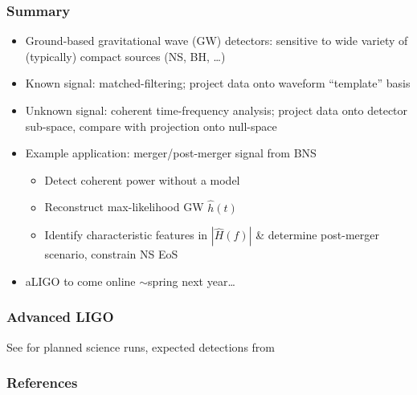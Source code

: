 \documentclass{beamer}
\def\gw#1{gravitational wave#1 (GW#1)\gdef\gw{GW}}
\newcommand{\red}[1]{{\color{red}{#1}}}
\begin{document}
\begin{frame}
    \frametitle{Summary}
    \small{
    \begin{itemize}
        \item Ground-based \gw{} detectors: sensitive to wide variety of
            (typically) compact sources (NS, BH, \dots)
        \item Known signal: matched-filtering; project data onto waveform
            ``template'' basis
        \item Unknown signal: coherent time-frequency analysis; project data
            onto detector sub-space, compare with projection onto null-space
        \item Example application: merger/post-merger signal from BNS
            \begin{itemize}
                \item Detect coherent power without a model
                \item Reconstruct max-likelihood \gw{} $\hat{h}(t)$
                \item Identify characteristic features in $|\hat{H}(f)|$ \&
                    determine post-merger scenario, constrain NS EoS
            \end{itemize}
        \item aLIGO to come online $\sim$spring next year\dots
    \end{itemize}
}

\end{frame}

\begin{frame}
    \frametitle{Advanced LIGO}
    \small{
    See \cite{2013arXiv1304.0670L} for planned science runs, expected
detections from \red{\emph{next year}}}
    \centering
\end{frame}

\begin{frame}[allowframebreaks]
    \frametitle{References}
    \tiny{
    
    }
\end{frame}
\end{document}
